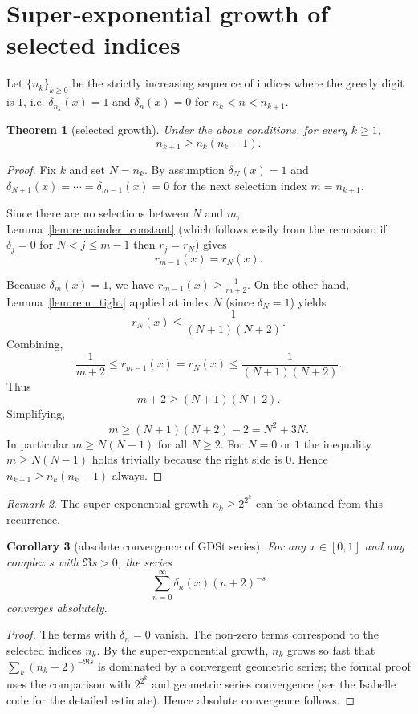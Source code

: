 \documentclass[11pt,a4paper]{article}
\newtheorem{theorem}{Theorem}[section]
\newtheorem{corollary}[theorem]{Corollary}
\theoremstyle{definition}
\theoremstyle{remark}
\newtheorem{remark}[theorem]{Remark}
\begin{document}
\section{Super‑exponential growth of selected indices}

Let \(\{n_k\}_{k\ge0}\) be the strictly increasing sequence of indices where the greedy digit is \(1\), i.e. \(\delta_{n_k}(x)=1\) and \(\delta_n(x)=0\) for \(n_k<n<n_{k+1}\).

\begin{theorem}[selected growth]\label{thm:growth}
Under the above conditions, for every \(k\ge 1\),
\[
n_{k+1} \ge n_k (n_k-1).
\]
\end{theorem}
\begin{proof}
Fix \(k\) and set \(N = n_k\). By assumption \(\delta_N(x)=1\) and \(\delta_{N+1}(x)=\cdots=\delta_{m-1}(x)=0\) for the next selection index \(m = n_{k+1}\).

Since there are no selections between \(N\) and \(m\), Lemma~\ref{lem:remainder_constant} (which follows easily from the recursion: if \(\delta_j=0\) for \(N<j\le m-1\) then \(r_j = r_N\)) gives
\[
r_{m-1}(x) = r_N(x).
\]

Because \(\delta_m(x)=1\), we have \(r_{m-1}(x) \ge \frac1{m+2}\).
On the other hand, Lemma~\ref{lem:rem_tight} applied at index \(N\) (since \(\delta_N=1\)) yields
\[
r_N(x) \le \frac1{(N+1)(N+2)}.
\]
Combining,
\[
\frac1{m+2} \le r_{m-1}(x) = r_N(x) \le \frac1{(N+1)(N+2)}.
\]
Thus
\[
m+2 \ge (N+1)(N+2).
\]
Simplifying,
\[
m \ge (N+1)(N+2)-2 = N^2 + 3N.
\]
In particular \(m \ge N(N-1)\) for all \(N\ge 2\). For \(N=0\) or \(1\) the inequality \(m\ge N(N-1)\) holds trivially because the right side is \(0\). Hence \(n_{k+1} \ge n_k(n_k-1)\) always.
\end{proof}

\begin{remark}
The super‑exponential growth \(n_k \ge 2^{2^k}\) can be obtained from this recurrence.
\end{remark}

\begin{corollary}[absolute convergence of GDSt series]\label{cor:soluble}
For any \(x\in[0,1]\) and any complex \(s\) with \(\Re s>0\), the series
\[
\sum_{n=0}^{\infty} \delta_n(x) (n+2)^{-s}
\]
converges absolutely.
\end{corollary}
\begin{proof}
The terms with \(\delta_n=0\) vanish. The non‑zero terms correspond to the selected indices \(n_k\). By the super‑exponential growth, \(n_k\) grows so fast that \(\sum_k (n_k+2)^{-\Re s}\) is dominated by a convergent geometric series; the formal proof uses the comparison with \(2^{2^k}\) and geometric series convergence (see the Isabelle code for the detailed estimate). Hence absolute convergence follows.
\end{proof}
\end{document}
